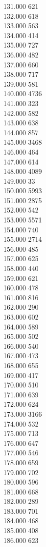{ 131.000	621 \\
 132.000	618 \\
 133.000	563 \\
 134.000	414 \\
 135.000	727 \\
 136.000	482 \\
 137.000	660 \\
 138.000	717 \\
 139.000	581 \\
 140.000	4736 \\
 141.000	323 \\
 142.000	582 \\
 143.000	638 \\
 144.000	857 \\
 145.000	3468 \\
 146.000	464 \\
 147.000	614 \\
 148.000	4089 \\
 149.000	33 \\
 150.000	5993 \\
 151.000	2875 \\
 152.000	542 \\
 153.000	5571 \\
 154.000	740 \\
 155.000	2714 \\
 156.000	485 \\
 157.000	625 \\
 158.000	440 \\
 159.000	621 \\
 160.000	478 \\
 161.000	816 \\
 162.000	290 \\
 163.000	602 \\
 164.000	589 \\
 165.000	502 \\
 166.000	540 \\
 167.000	473 \\
 168.000	655 \\
 169.000	417 \\
 170.000	510 \\
 171.000	639 \\
 172.000	624 \\
 173.000	3166 \\
 174.000	532 \\
 175.000	713 \\
 176.000	647 \\
 177.000	546 \\
 178.000	659 \\
 179.000	702 \\
 180.000	596 \\
 181.000	668 \\
 182.000	289 \\
 183.000	701 \\
 184.000	468 \\
 185.000	408 \\
 186.000	623 \\
}
